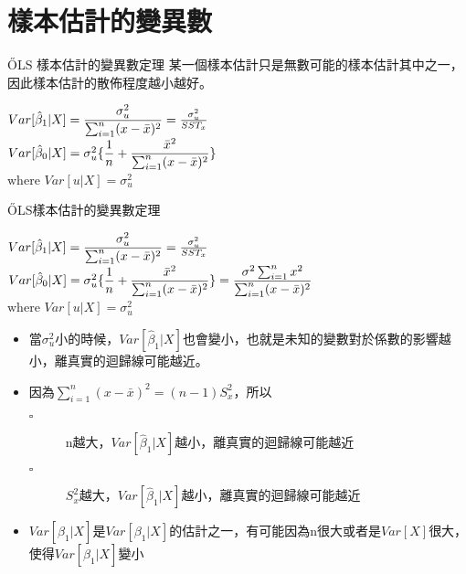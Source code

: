 \documentclass[xcolor=dvipsnames]{beamer}
\begin{document}
\section{樣本估計的變異數}
\begin{frame}{\H OLS 樣本估計的變異數定理}
某一個樣本估計只是無數可能的樣本估計其中之一，因此樣本估計的散佈程度越小越好。
\begin{theorem}

$Var[\hat{\beta}_{1}|X]=\mathlarger{\frac{\sigma_{u}^{2}}{\sum_{i=1}^{n}(x-\bar{x})^2}}=\frac{\sigma_{u}^{2}}{SST_{x}}$\\
$Var[\hat{\beta}_{0}|X]=\sigma_{u}^{2}\mathlarger{\{\frac{1}{n}+\frac{\bar{x}^2}{\sum_{i=1}^{n}(x-\bar{x})^2}}\}$\\
$\mathrm{where}$ $Var[u|X]=\sigma_{u}^{2}$
\end{theorem}
\end{frame}
\begin{frame}{\H OLS樣本估計的變異數定理}
\begin{Theorem}
$Var[\hat{\beta}_{1}|X]=\mathlarger{\frac{\sigma_{u}^{2}}{\sum_{i=1}^{n}(x-\bar{x})^2}}=\frac{\sigma_{u}^{2}}{SST_{x}}$\\
$Var[\hat{\beta}_{0}|X]=\sigma_{u}^{2}\mathlarger{\{\frac{1}{n}+\frac{\bar{x}^2}{\sum_{i=1}^{n}(x-\bar{x})^2}}\}=\mathlarger{\frac{\sigma^2\sum_{i=1}^{n}x^2}{\sum_{i=1}^{n}(x-\bar{x})^2}}$\\
$\mathrm{where}$ $Var[u|X]=\sigma_{u}^{2}$
\end{Theorem}
\begin{itemize}
\item 當$\sigma_{u}^{2}$小的時候，$Var[\hat{\beta}_{1}|X]$也會變小，也就是未知的變數對於係數的影響越小，離真實的迴歸線可能越近。
\item 因為$\sum_{i=1}^{n}(x-\bar{x})^2=(n-1)S_{x}^{2} $，所以
\begin{description}
\item [$ \square $]n越大，$Var[\hat{\beta}_{1}|X]$越小，離真實的迴歸線可能越近
\item [$\square  $]$ S_{x}^{2} $越大，$Var[\hat{\beta}_{1}|X]$越小，離真實的迴歸線可能越近
\end{description}
\item $Var[\hat{\beta}_{1}|X]$是$Var[\beta_{1}|X]$的估計之一，有可能因為n很大或者是$ Var[X] $很大，使得$Var[\hat{\beta}_{1}|X]$變小
\end{itemize}
\end{frame}
\end{document}
